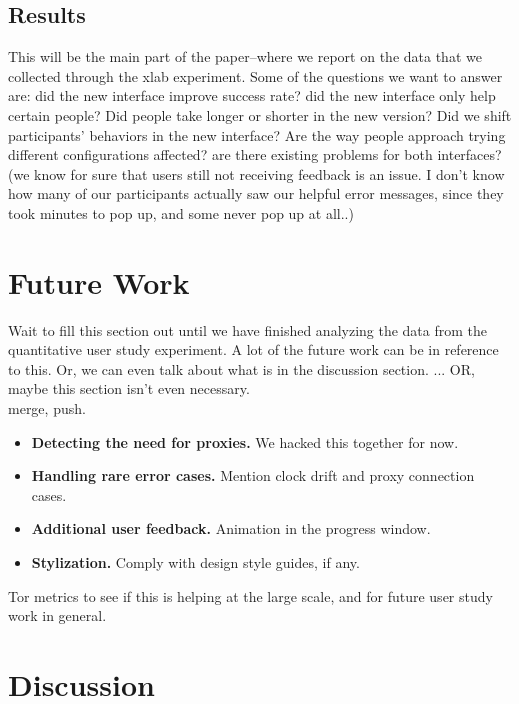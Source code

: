 \documentclass{template}
\begin{document}
\subsection{Results} 
{\color {red} This will be the main part of the paper--where we report on the data that we collected through the xlab experiment. Some of the questions we want to answer are: did the new interface improve success rate? did the new interface only help certain people? Did people take longer or shorter in the new version? Did we shift participants' behaviors in the new interface? Are the way people approach trying different configurations affected? are there existing problems for both interfaces? (we know for sure that users still not receiving feedback is an issue. I don't know how many of our participants actually saw our helpful error messages, since they took minutes to pop up, and some never pop up at all..)} 

\section{Future Work} 
{\color {red}
Wait to fill this section out until we have finished analyzing the data from the quantitative
user study experiment. A lot of the future work can be in reference to this. Or, we can even
talk about what is in the discussion section. ... OR, maybe this section isn't even necessary.\\

 merge, push. \\

\begin{itemize} \itemsep1pt \parskip0pt  
\item {\bfseries Detecting the need for proxies.} We hacked this together for now. 
\item {\bfseries Handling rare error cases.} Mention clock drift and proxy connection cases.
\item {\bfseries Additional user feedback.} Animation in the progress window. 
\item {\bfseries Stylization.} Comply with design style guides, if any. 
\end{itemize} 

 Tor metrics to see if this is helping at the large scale, and for future user study work in general. 
}

\section{Discussion} 
\end{document}
